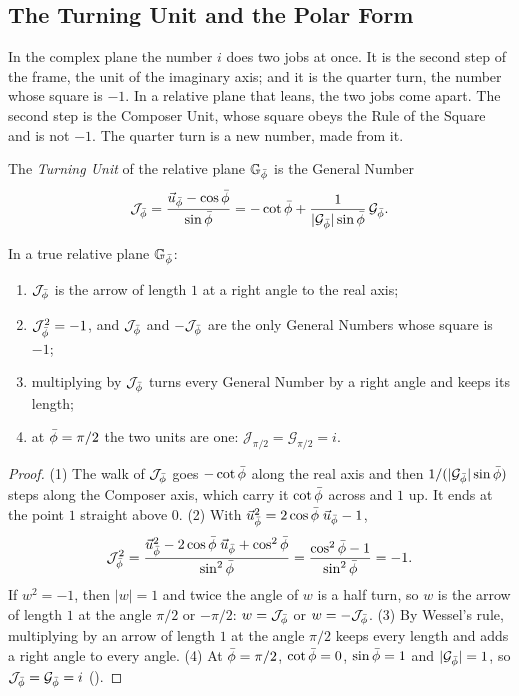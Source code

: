 \subsection{The Turning Unit and the Polar Form}\label{subsec:gn-turning-unit}

In the complex plane the number $i$ does two jobs at once. It is the second step of the frame, the unit of the imaginary axis; and it is the quarter turn, the number whose square is $-1$. In a relative plane that leans, the two jobs come apart. The second step is the Composer Unit, whose square obeys the Rule of the Square and is not $-1$. The quarter turn is a new number, made from it.

\begin{definition}\label{def:gn-turning-unit}
The \emph{Turning Unit} of the relative plane $\mathbb{G}_{\bar{\phi}}$ is the General Number
\[
\mathcal{J}_{\bar{\phi}} = \frac{\vec{u}_{\bar{\phi}} - \cos\bar{\phi}}{\sin\bar{\phi}} = -\cot\bar{\phi} + \frac{1}{|\mathcal{G}_{\bar{\phi}}|\sin\bar{\phi}}\,\mathcal{G}_{\bar{\phi}} .
\]
\end{definition}

\begin{theorem}\label{thm:gn-turning-unit}
In a true relative plane $\mathbb{G}_{\bar{\phi}}$:
\begin{enumerate}
  \item $\mathcal{J}_{\bar{\phi}}$ is the arrow of length $1$ at a right angle to the real axis;
  \item $\mathcal{J}_{\bar{\phi}}^2 = -1$, and $\mathcal{J}_{\bar{\phi}}$ and $-\mathcal{J}_{\bar{\phi}}$ are the only General Numbers whose square is $-1$;
  \item multiplying by $\mathcal{J}_{\bar{\phi}}$ turns every General Number by a right angle and keeps its length;
  \item at $\bar{\phi} = \pi/2$ the two units are one: $\mathcal{J}_{\pi/2} = \mathcal{G}_{\pi/2} = i$.
\end{enumerate}
\end{theorem}

\begin{proof}
(1) The walk of $\mathcal{J}_{\bar{\phi}}$ goes $-\cot\bar{\phi}$ along the real axis and then $1/(|\mathcal{G}_{\bar{\phi}}|\sin\bar{\phi})$ steps along the Composer axis, which carry it $\cot\bar{\phi}$ across and $1$ up. It ends at the point $1$ straight above $0$. (2) With $\vec{u}_{\bar{\phi}}^2 = 2\cos\bar{\phi}\;\vec{u}_{\bar{\phi}} - 1$,
\[
\mathcal{J}_{\bar{\phi}}^2 = \frac{\vec{u}_{\bar{\phi}}^2 - 2\cos\bar{\phi}\;\vec{u}_{\bar{\phi}} + \cos^2\bar{\phi}}{\sin^2\bar{\phi}} = \frac{\cos^2\bar{\phi} - 1}{\sin^2\bar{\phi}} = -1 .
\]
If $w^2 = -1$, then $|w| = 1$ and twice the angle of $w$ is a half turn, so $w$ is the arrow of length $1$ at the angle $\pi/2$ or $-\pi/2$: $w = \mathcal{J}_{\bar{\phi}}$ or $w = -\mathcal{J}_{\bar{\phi}}$. (3) By Wessel's rule, multiplying by an arrow of length $1$ at the angle $\pi/2$ keeps every length and adds a right angle to every angle. (4) At $\bar{\phi} = \pi/2$, $\cot\bar{\phi} = 0$, $\sin\bar{\phi} = 1$ and $|\mathcal{G}_{\bar{\phi}}| = 1$, so $\mathcal{J}_{\bar{\phi}} = \mathcal{G}_{\bar{\phi}} = i$ ().
\end{proof}

